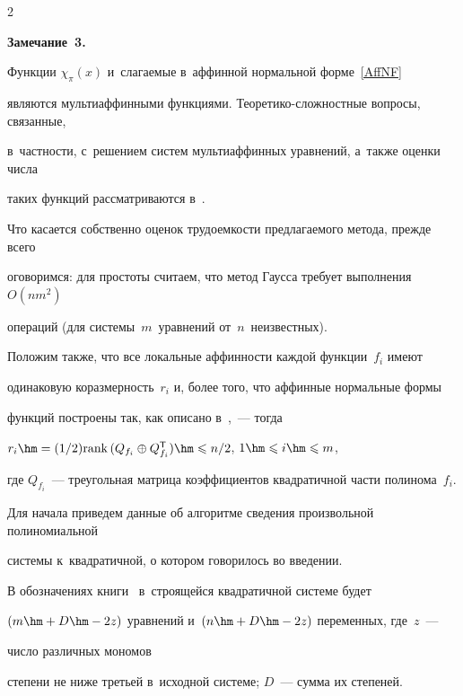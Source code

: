 \begin{multicols}{2}
\medskip





\noindent


\textbf{Замечание~3.}


Функции $\chi_{\pi}(x)$ и~слагаемые в~аффинной нормальной форме~\eqref{AffNF} 


являются мультиаффинными функциями. Теоретико-сложностные вопросы, связанные, 


в~частности, с~решением сис\-тем мультиаффинных уравнений, а~также оценки чис\-ла 


таких функций рассматриваются в~\cite{Gor1995,GT2017}.








\medskip





Что касается собственно оценок трудоемкости предлагаемого метода, прежде всего 


оговоримся: для простоты считаем, что метод Гаусса требует выполнения~$O(nm^2)$ 


операций (для системы~$m$~уравнений от~$n$~неизвестных).


Положим также, что все локальные аффинности каждой функции~$f_i$ имеют 


одинаковую коразмерность~$r_i$ и, более того, что аффинные нормальные формы 


функций построены так, как описано в~\cite{LSF2019},~--- тогда


$r_i\hm=({1}/{2})\rank (Q_{f_i}\oplus Q_{f_i}\Tsf)\hm\leqslant 


{n}/{2}$, $1\hm\leqslant i\hm\leqslant  m$, 


где $Q_{f_i}$~--- треугольная матрица коэффициентов квад\-ра\-тич\-ной части   полинома~$f_i$.





Для начала приведем данные об алгоритме сведения произвольной полиномиальной 


системы к~квадратичной, о котором говорилось во введении.


В обозначениях книги~\cite{Bard2009} в~строящейся квад\-ра\-тичной системе будет 


$(m\hm+D\hm-2z)$ уравнений и~$(n\hm+D\hm-2z)$ переменных, где~$z$~--- 


число различных мономов 


степени не ниже третьей в~исходной системе; $D$~--- сумма их степеней. 



\end{multicols}
